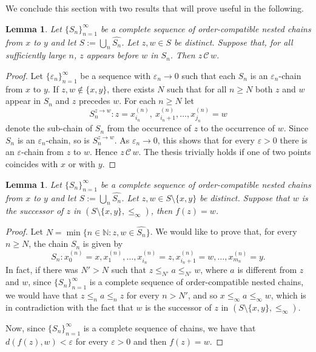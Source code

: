 \documentclass[10pt,a4paper]{article}
\theoremstyle{definition}
\theoremstyle{remark}
\theoremstyle{plain}
\newtheorem{lem}[defi]{Lemma}
\begin{document}
We conclude this section with two results that will prove useful in the following.

\begin{lem}\label{lem:ONC-implies-chain}
Let $\{S_n\}_{n=1}^{\infty}$ be a complete sequence of order-compatible nested chains from $x$ to $y$
and let $S:=\bigcup_n \widehat{S_n}$. Let $z,w\in S$ be
distinct. Suppose that, for all sufficiently large $n$, $z$ appears
before $w$ in $S_n$. Then $z\,\mathcal{C}\,w$.
\end{lem}

\begin{proof}
Let $\{\varepsilon_n\}_{n=1}^\infty$ be a sequence with $\varepsilon_n\to 0$ such
that each $S_n$ is an $\varepsilon_n$-chain from $x$ to $y$. If $z,w \notin \{x,y\}$, there exists $N$ such that for all $n\ge N$
both $z$ and $w$ appear in $S_n$ and $z$ precedes $w$. For each $n\ge N$
let
$$
   S_n^{z\to w} :z=x_{i_n}^{(n)},\ x_{i_n+1}^{(n)},\dots,x_{j_n}^{(n)}=w
$$
denote the sub-chain of $S_n$ from the occurrence of $z$ to the occurrence of $w$. Since $S_n$ is an $\varepsilon_n$-chain, so
is $S_n^{z\to w}$. As $\varepsilon_n\to 0$, this shows that for every
$\varepsilon>0$ there is an $\varepsilon$-chain from $z$
to $w$. Hence $z\,\mathcal{C}\,w$. The thesis trivially holds if one of two points coincides with $x$ or with $y$.
\end{proof}
\begin{lem}\label{successor}
Let $\{S_n\}_{n=1}^{\infty}$ be a complete sequence of order-compatible nested chains from $x$ to $y$
and let $S:=\bigcup_n \widehat{S_n}$. Let $z,w\in S\setminus\{x,y\}$ be
distinct. Suppose that $w$ is the successor of $z$ in $(S\setminus\{x,y\},\le_\infty)$, then $f(z)=w$.
\end{lem}
\begin{proof}
Let $N=\min\{n\in\mathbb{N}: z,w\in\widehat{S_n}\}$. We would like to prove that, for every $n\geq N$, the chain $S_n$ is given by $$S_n: x_0^{(n)}=x,x^{(n)}_1,\dots,x^{(n)}_{i_n}=z,x^{(n)}_{i_n+1}=w,\dots,x^{(n)}_{m_n}=y.$$
In fact, if there was $N'>N$ such that $z\le_{N'} a\le_{N'} w $, where $a$ is different from $z$ and $w$, since $\{S_n\}_{n=1}^\infty$ is a complete sequence of order-compatible nested chains, we would have that $z\le_n a\le_n z$ for every $n>N'$, and so $x\le_\infty a\le_\infty w$, which is in contradiction with the fact that $w$ is the successor of $z$ in $(S\setminus\{x,y\},\le_\infty)$.

Now, since $\{S_n\}_{n=1}^\infty$ is a complete sequence of chains, we have that $d(f(z),w)<\varepsilon$ for every $\varepsilon>0$ and then $f(z)=w$.
\end{proof}
\end{document}
